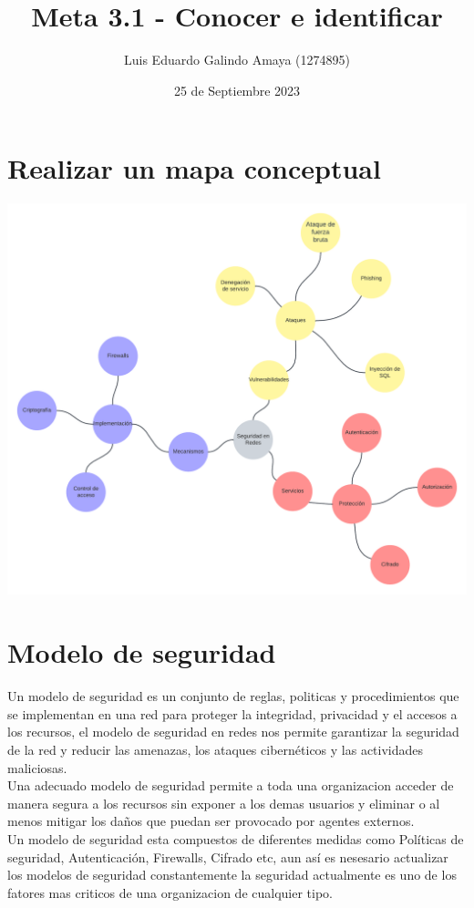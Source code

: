 \documentclass[11pt]{article}
\author{Luis Eduardo Galindo Amaya (1274895)}
\date{25 de Septiembre 2023}
\title{Meta 3.1 - Conocer e identificar}
\begin{document}
\tableofcontents
\pagebreak
{}

\section{Realizar un mapa conceptual}
\label{sec:org651c497}
\begin{center}
\includegraphics[width=.9\linewidth]{Mapa mental.png}
\end{center}

\cite{Stallings}

\section{Modelo de seguridad}
\label{sec:org2eaadda}
Un modelo de seguridad es un conjunto de reglas, politicas y procedimientos que 
se implementan en una red para proteger la integridad, privacidad y el accesos
a los recursos, el modelo de seguridad en redes nos permite garantizar la 
seguridad de la red y reducir las amenazas, los ataques cibernéticos y las 
actividades maliciosas. \\


Una adecuado modelo de seguridad permite a toda una organizacion acceder de 
manera segura a los recursos sin exponer a los demas usuarios y eliminar o al 
menos mitigar los daños que puedan ser provocado por agentes externos. \\


Un modelo de seguridad esta compuestos de diferentes medidas como 
Políticas de seguridad, Autenticación, Firewalls, Cifrado etc, aun así es 
nesesario actualizar los modelos de seguridad constantemente la seguridad 
actualmente es uno de los fatores mas criticos de una organizacion de cualquier
tipo.
\end{document}
